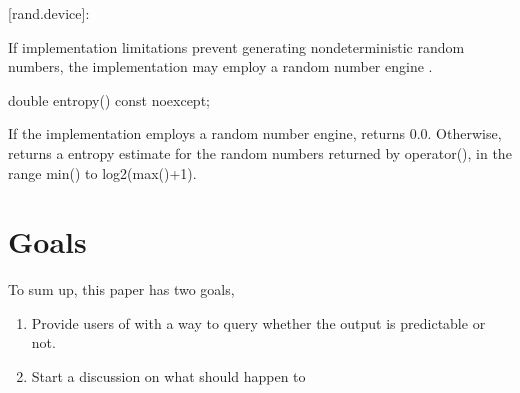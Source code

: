 \documentclass{wg21}
\begin{document}
[rand.device]:

\begin{itemdescr}
    If implementation limitations prevent generating nondeterministic
    random numbers, the implementation may employ a random number engine
    .
\end{itemdescr}

\vskip 0.5cm


\begin{codeblock}
double entropy() const noexcept;
\end{codeblock}

\begin{itemdescr}
    \returns If the implementation employs a random number engine, returns 0.0. Otherwise, returns a  entropy estimate for the random numbers returned by operator(), in the range min() to log2(max()+1).
\end{itemdescr}



\hypertarget{goals}{%
    \section{Goals}\label{goals}}

To sum up, this paper has two goals,
\begin{enumerate}
    \item Provide users of  with a way to query
    whether the output is predictable or not.
    \item Start a discussion on what should happen to
\end{enumerate}
\end{document}
